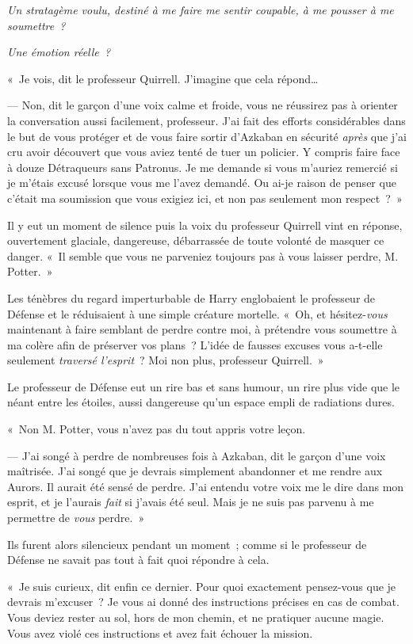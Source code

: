 \emph{Un stratagème voulu, destiné à me faire me sentir coupable, à me pousser à me soumettre~?}

\emph{Une émotion réelle~?}

«~Je vois, dit le professeur Quirrell.
J'imagine que cela répond…

--- Non, dit le garçon d'une voix calme et froide, vous ne réussirez pas à orienter la conversation aussi facilement, professeur.
J'ai fait des efforts considérables dans le but de vous protéger et de vous faire sortir d'Azkaban en sécurité \emph{après} que j'ai cru avoir découvert que vous aviez tenté de tuer un policier.
Y compris faire face à douze Détraqueurs sans Patronus.
Je me demande si vous m'auriez remercié si je m'étais excusé lorsque vous me l'avez demandé.
Ou ai-je raison de penser que c'était ma soumission que vous exigiez ici, et non pas seulement mon respect~?~»

Il y eut un moment de silence puis la voix du professeur Quirrell vint en réponse, ouvertement glaciale, dangereuse, débarrassée de toute volonté de masquer ce danger.
«~Il semble que vous ne parveniez toujours pas à vous laisser perdre, M. Potter.~»

Les ténèbres du regard imperturbable de Harry englobaient le professeur de Défense et le réduisaient à une simple créature mortelle.
«~Oh, et hésitez-\emph{vous} maintenant à faire semblant de perdre contre moi, à prétendre vous soumettre à ma colère afin de préserver vos plans~?
L'idée de fausses excuses vous a-t-elle seulement \emph{traversé l'esprit}~?
Moi non plus, professeur Quirrell.~»

Le professeur de Défense eut un rire bas et sans humour, un rire plus vide que le néant entre les étoiles, aussi dangereuse qu'un espace empli de radiations dures.

«~Non M. Potter, vous n'avez pas du tout appris votre leçon.

--- J'ai songé à perdre de nombreuses fois à Azkaban, dit le garçon d'une voix maîtrisée.
J'ai songé que je devrais simplement abandonner et me rendre aux Aurors.
Il aurait été sensé de perdre.
J'ai entendu votre voix me le dire dans mon esprit, et je l'aurais \emph{fait} si j'avais été seul.
Mais je ne suis pas parvenu à me permettre de \emph{vous} perdre.~»

Ils furent alors silencieux pendant un moment~; comme si le professeur de Défense ne savait pas tout à fait quoi répondre à cela.

«~Je suis curieux, dit enfin ce dernier.
Pour quoi exactement pensez-vous que je devrais m'excuser~?
Je vous ai donné des instructions précises en cas de combat.
Vous deviez rester au sol, hors de mon chemin, et ne pratiquer aucune magie.
Vous avez violé ces instructions et avez fait échouer la mission.

